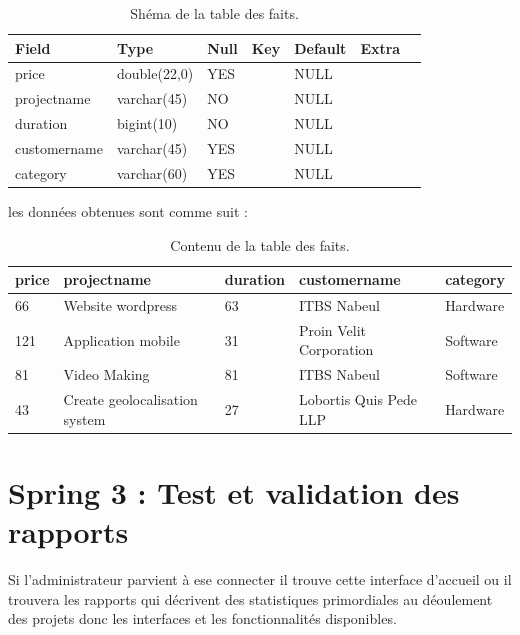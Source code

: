 \begin{table}

\begin{tabular}{|l|l|l|l|l|l|l|}
\hline
 \textbf{Field}        & \textbf{Type}         & \textbf{Null} & \textbf{Key}  & \textbf{Default} & \textbf{Extra}   \\
\hline
price        & double(22,0) & YES  &     & NULL    &         \\
\hline
projectname  & varchar(45)  & NO   &     & NULL    &         \\
\hline
duration     & bigint(10)   & NO   &     & NULL    &         \\
\hline
customername & varchar(45)  & YES  &     & NULL    &         \\
\hline
category     & varchar(60)  & YES  &     & NULL    &         \\
\hline
\end{tabular}
\centering
\caption{Sh\'{e}ma de la table des faits.}
\end{table}



les donn\'{e}es obtenues sont comme suit :

\begin{table}

\begin{tabular}{|l|l|l|l|l|}
\hline
price & projectname                   & duration & customername            & category  \\
\hline
66    & Website wordpress             & 63       & ITBS Nabeul             & Hardware  \\
\hline
121   & Application mobile            & 31       & Proin Velit Corporation & Software  \\
\hline
81    & Video Making                  & 81       & ITBS Nabeul             & Software  \\
\hline
43    & Create geolocalisation system & 27       & Lobortis Quis Pede LLP  & Hardware  \\
\hline
\end{tabular}
\centering
\caption{Contenu de la table des faits.}
\end{table}


\section{Spring 3 : Test et validation des rapports}


Si l'administrateur parvient \`{a} ese connecter il trouve cette interface d'accueil
ou il trouvera les rapports qui d\'{e}crivent des statistiques primordiales au
d\'{e}oulement des projets donc les interfaces et les fonctionnalit\'{e}s disponibles.

